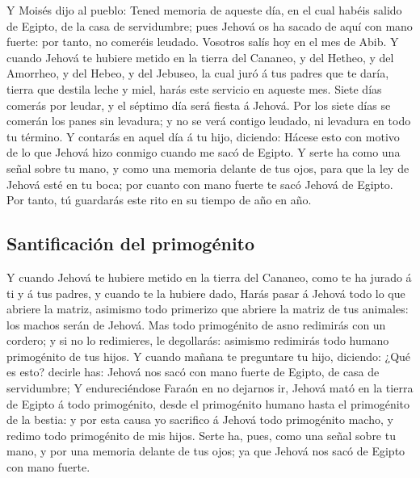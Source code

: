  Y Moisés dijo al pueblo: Tened memoria de aqueste día, en
el cual habéis salido de Egipto, de la casa de servidumbre; pues Jehová
os ha sacado de aquí con mano fuerte: por tanto, no comeréis leudado.
 Vosotros salís hoy en el mes de Abib.  Y
cuando Jehová te hubiere metido en la tierra del Cananeo, y del Hetheo,
y del Amorrheo, y del Hebeo, y del Jebuseo, la cual juró á tus padres
que te daría, tierra que destila leche y miel, harás este servicio en
aqueste mes.  Siete días comerás por leudar, y el séptimo
día será fiesta á Jehová.  Por los siete días se comerán
los panes sin levadura; y no se verá contigo leudado, ni levadura en
todo tu término.  Y contarás en aquel día á tu hijo,
diciendo: Hácese esto con motivo de lo que Jehová hizo conmigo cuando me
sacó de Egipto.  Y serte ha como una señal sobre tu mano,
y como una memoria delante de tus ojos, para que la ley de Jehová esté
en tu boca; por cuanto con mano fuerte te sacó Jehová de Egipto.
 Por tanto, tú guardarás este rito en su tiempo de año en
año.

\hypertarget{santificaciuxf3n-del-primoguxe9nito}{%
\subsection{Santificación del
primogénito}\label{santificaciuxf3n-del-primoguxe9nito}}

 Y cuando Jehová te hubiere metido en la tierra del
Cananeo, como te ha jurado á ti y á tus padres, y cuando te la hubiere
dado,  Harás pasar á Jehová todo lo que abriere la
matriz, asimismo todo primerizo que abriere la matriz de tus animales:
los machos serán de Jehová.  Mas todo primogénito de asno
redimirás con un cordero; y si no lo redimieres, le degollarás: asimismo
redimirás todo humano primogénito de tus hijos.  Y cuando
mañana te preguntare tu hijo, diciendo: ¿Qué es esto? decirle has:
Jehová nos sacó con mano fuerte de Egipto, de casa de servidumbre;
 Y endureciéndose Faraón en no dejarnos ir, Jehová mató
en la tierra de Egipto á todo primogénito, desde el primogénito humano
hasta el primogénito de la bestia: y por esta causa yo sacrifico á
Jehová todo primogénito macho, y redimo todo primogénito de mis hijos.
 Serte ha, pues, como una señal sobre tu mano, y por una
memoria delante de tus ojos; ya que Jehová nos sacó de Egipto con mano
fuerte.

